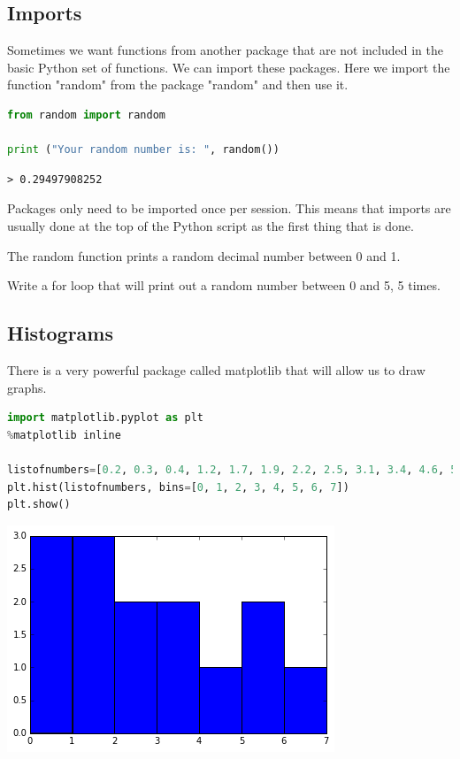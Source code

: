	\subsection{Imports}
		Sometimes we want functions from another package that are not included in the basic Python set of functions. We can import these packages. Here we import the function "random" from the package "random" and then use it.
		\begin{lstlisting}[language=Python]
from random import random

print ("Your random number is: ", random())\end{lstlisting}
		\begin{verbatim}> 0.29497908252\end{verbatim}
		Packages only need to be imported once per session. This means that imports are usually done at the top of the Python script as the first thing that is done.
		
		The random function prints a random decimal number between 0 and 1.
		\begin{task}Write a for loop that will print out a random number between 0 and 5, 5 times.\end{task}
		
	\subsection{Histograms}
		
		There is a very powerful package called matplotlib that will allow us to draw graphs.
		\begin{lstlisting}[language=Python]
import matplotlib.pyplot as plt
%matplotlib inline

listofnumbers=[0.2, 0.3, 0.4, 1.2, 1.7, 1.9, 2.2, 2.5, 3.1, 3.4, 4.6, 5.1, 5.6, 6.0, 7.4, 7.4, 7.6]
plt.hist(listofnumbers, bins=[0, 1, 2, 3, 4, 5, 6, 7])
plt.show()\end{lstlisting}
		\includegraphics[scale=0.5]{images/histogram}

